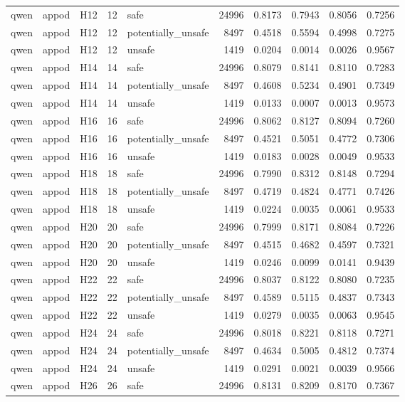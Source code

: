 \begin{table}[tbp]
\begin{tabular}{lllrlrrrrr}
qwen & appod & H12 & 12 & safe & 24996 & 0.8173 & 0.7943 & 0.8056 & 0.7256 \\
qwen & appod & H12 & 12 & potentially\_unsafe & 8497 & 0.4518 & 0.5594 & 0.4998 & 0.7275 \\
qwen & appod & H12 & 12 & unsafe & 1419 & 0.0204 & 0.0014 & 0.0026 & 0.9567 \\
qwen & appod & H14 & 14 & safe & 24996 & 0.8079 & 0.8141 & 0.8110 & 0.7283 \\
qwen & appod & H14 & 14 & potentially\_unsafe & 8497 & 0.4608 & 0.5234 & 0.4901 & 0.7349 \\
qwen & appod & H14 & 14 & unsafe & 1419 & 0.0133 & 0.0007 & 0.0013 & 0.9573 \\
qwen & appod & H16 & 16 & safe & 24996 & 0.8062 & 0.8127 & 0.8094 & 0.7260 \\
qwen & appod & H16 & 16 & potentially\_unsafe & 8497 & 0.4521 & 0.5051 & 0.4772 & 0.7306 \\
qwen & appod & H16 & 16 & unsafe & 1419 & 0.0183 & 0.0028 & 0.0049 & 0.9533 \\
qwen & appod & H18 & 18 & safe & 24996 & 0.7990 & 0.8312 & 0.8148 & 0.7294 \\
qwen & appod & H18 & 18 & potentially\_unsafe & 8497 & 0.4719 & 0.4824 & 0.4771 & 0.7426 \\
qwen & appod & H18 & 18 & unsafe & 1419 & 0.0224 & 0.0035 & 0.0061 & 0.9533 \\
qwen & appod & H20 & 20 & safe & 24996 & 0.7999 & 0.8171 & 0.8084 & 0.7226 \\
qwen & appod & H20 & 20 & potentially\_unsafe & 8497 & 0.4515 & 0.4682 & 0.4597 & 0.7321 \\
qwen & appod & H20 & 20 & unsafe & 1419 & 0.0246 & 0.0099 & 0.0141 & 0.9439 \\
qwen & appod & H22 & 22 & safe & 24996 & 0.8037 & 0.8122 & 0.8080 & 0.7235 \\
qwen & appod & H22 & 22 & potentially\_unsafe & 8497 & 0.4589 & 0.5115 & 0.4837 & 0.7343 \\
qwen & appod & H22 & 22 & unsafe & 1419 & 0.0279 & 0.0035 & 0.0063 & 0.9545 \\
qwen & appod & H24 & 24 & safe & 24996 & 0.8018 & 0.8221 & 0.8118 & 0.7271 \\
qwen & appod & H24 & 24 & potentially\_unsafe & 8497 & 0.4634 & 0.5005 & 0.4812 & 0.7374 \\
qwen & appod & H24 & 24 & unsafe & 1419 & 0.0291 & 0.0021 & 0.0039 & 0.9566 \\
qwen & appod & H26 & 26 & safe & 24996 & 0.8131 & 0.8209 & 0.8170 & 0.7367 \\

\end{tabular}
\end{table}
